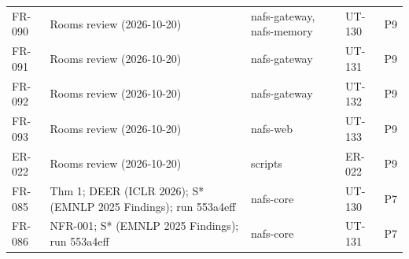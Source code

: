 \begin{longtable}{@{}p{1.45cm}p{4.4cm}p{4.2cm}p{3.1cm}p{1.1cm}@{}}
FR-090 & Rooms review (2026-10-20) & nafs-gateway, nafs-memory & UT-130 & P9\\
FR-091 & Rooms review (2026-10-20) & nafs-gateway & UT-131 & P9\\
FR-092 & Rooms review (2026-10-20) & nafs-gateway & UT-132 & P9\\
FR-093 & Rooms review (2026-10-20) & nafs-web & UT-133 & P9\\
ER-022 & Rooms review (2026-10-20) & scripts & ER-022 & P9\\
FR-085 & Thm 1; DEER (ICLR 2026); S* (EMNLP 2025 Findings); run 553a4eff & nafs-core & UT-130 & P7\\
FR-086 & NFR-001; S* (EMNLP 2025 Findings); run 553a4eff & nafs-core & UT-131 & P7\\
\end{longtable}
